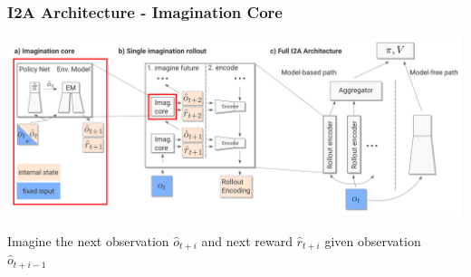 \begin{frame}
    \frametitle{I2A Architecture - Imagination Core}


\includegraphics[width=\columnwidth]{./Images/i2a_all_imagination_core.png}%

\begin{PraesentationAufzaehlung}
	\item Imagine the next observation $\hat{o}_{t+i}$ and next reward $\hat{r}_{t+i}$ given observation $\hat{o}_{t+i-1}$
\end{PraesentationAufzaehlung}
\end{frame}
\clearpage



    

